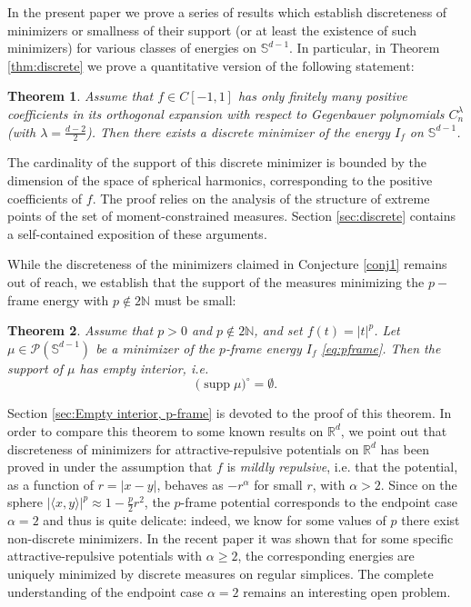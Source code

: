 \documentclass[11pt, leqno]{amsart}
\def\N{\mathbb N}
\def\R{\mathbb R}
\def\S{\mathbb S}
\newtheorem{theorem}{Theorem}[section]
\theoremstyle{definition}
\numberwithin{equation}{section}
\begin{document}
In the present paper we prove a series of results which establish discreteness of minimizers or smallness of their support (or at least the existence of such minimizers) for various classes of energies on $\S^{d-1}$.  
In particular, in Theorem \ref{thm:discrete} we prove  a quantitative version of the following statement:
 \begin{theorem}\label{t:discrete1}
 Assume that  $f\in C[-1,1]$ has only  finitely many positive coefficients in its orthogonal expansion with respect to Gegenbauer polynomials $C_n^\lambda$ (with $\lambda=  \frac{d-2}{2}$). Then there exists a discrete minimizer of the energy $I_f$ on $\S^{d-1}$.   
 \end{theorem}
\noindent The cardinality of the support of this discrete minimizer is bounded by the dimension of the space of spherical harmonics, corresponding to the positive coefficients of $f$. 
The proof relies on the analysis of the structure of extreme points of the set of moment-constrained measures.  Section \ref{sec:discrete} contains a self-contained exposition of these arguments. 
 


While the discreteness of the minimizers  claimed in Conjecture \ref{conj1} remains out of reach, we establish that the support of the measures minimizing  the $p-$frame energy with  $p\not\in 2\N$ must be small: 
\begin{theorem}\label{t:pframe}
Assume that $p>0$ and $p\not\in 2\N$, and set $f(t) = |t|^p$. Let $\mu \in \mathcal P (\S^{d-1}) $ be a minimizer of the $p$-frame energy $I_f$ \eqref{eq:pframe}. Then the support of $\mu$ has empty interior, i.e. $$ \big( \operatorname{supp}  \mu \big)^\circ = \emptyset.$$
\end{theorem}

\noindent  Section \ref{sec:Empty interior, p-frame} is devoted to the proof of this theorem. In order to compare this theorem  to some known results on $\R^d$, we  point out that discreteness of minimizers for attractive-repulsive potentials on $\R^d$  has been proved  in \cite{carrillo2017geometry} under the assumption that $f$ is {\em mildly repulsive}, i.e. that the potential,  as a function of $r= |x-y|$, behaves as $-r^\alpha$ for small $r$, with $\alpha >2$. Since on the sphere  $\displaystyle{| \langle x,y \rangle |^p \approx 1 - \frac{p}{2} r^2 }$,  the $p$-frame potential corresponds to the endpoint case $\alpha =2$ and thus is quite  delicate: indeed, we know for some values of $p$ there exist non-discrete minimizers. In the recent paper \cite{LMc} it was shown that for  some specific attractive-repulsive potentials with $\alpha \ge 2$, the corresponding energies are uniquely minimized by discrete measures on regular simplices. The complete understanding of the endpoint case $\alpha =2 $ remains an interesting open problem.
 
\end{document}
